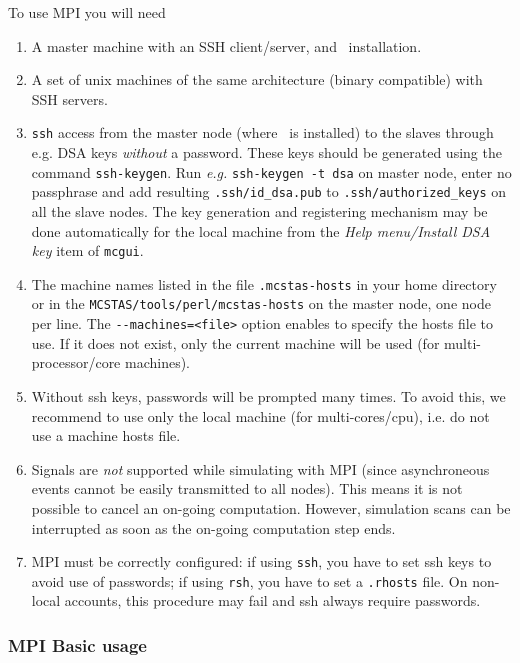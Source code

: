 To use MPI you will need
  \begin{enumerate}
  \item{A master machine with an SSH client/server, and \MCS\ installation.}
  \item{A set of unix machines of the same architecture (binary compatible) with SSH servers.}
  \item{ \texttt{ssh} access from the master node (where \MCS\ is
      installed) to the slaves through e.g. DSA keys \emph{without} a
      password. These keys should be generated using the command
      \texttt{ssh-keygen}. Run \emph{e.g.} \texttt{ssh-keygen -t dsa} on
      master node, enter no passphrase and add resulting
      \texttt{.ssh/id\_dsa.pub} to \texttt{.ssh/authorized\_keys}
      on all the slave nodes. The key generation and registering mechanism 
      may be done automatically for the local machine from the 
      \emph{Help menu/Install DSA key} item of \verb+mcgui+.}
  \item{The machine names listed in the file \texttt{.mcstas-hosts} in
      your home directory or in the \texttt{MCSTAS/tools/perl/mcstas-hosts} on
      the master node, one node per line. The \verb'--machines=<file>' option
      enables to specify the hosts file to use. If it does not exist, only 
      the current machine will be used (for multi-processor/core machines).}
  \item{Without ssh keys, passwords will be prompted many times. To avoid this, 
      we recommend to use only the local machine (for multi-cores/cpu), i.e. do
      not use a machine hosts file.}
  \item Signals are \emph{not} supported while simulating with MPI (since
    asynchroneous events cannot be easily transmitted to all nodes). This
    means it is not possible to cancel an on-going computation. However, 
    simulation scans can be interrupted as soon as the on-going computation 
    step ends.
  \item MPI must be correctly configured: if using \verb'ssh', you
    have to set ssh keys to avoid use of passwords; if
    using \verb'rsh', you have to set a \verb'.rhosts' file.
    On non-local accounts, this procedure may fail and ssh always require passwords.
  \end{enumerate}

\subsubsection{MPI Basic usage}

